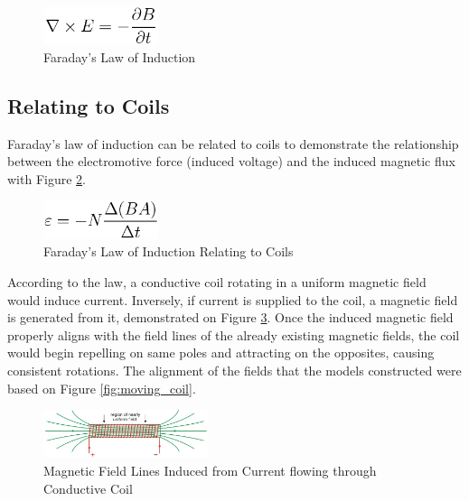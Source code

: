         \begin{figure}[ht]
            \begin{center}
                \includegraphics[width=0.3\textwidth]{figures/law_3.png}
                \caption{Faraday's Law of Induction} \label{fig:induction_law}
            \end{center}
        \end{figure}

    \subsection{Relating to Coils}
    Faraday's law of induction can be related to coils to demonstrate the relationship between the electromotive force (induced voltage) and the induced magnetic flux with Figure \ref{fig:coil_law}.\\

        \begin{figure}[ht]
            \begin{center}
                \includegraphics[width=0.3\textwidth]{figures/law_3c.png}
                \caption{Faraday's Law of Induction Relating to Coils} \label{fig:coil_law}
            \end{center}
        \end{figure}

    \noindent
    According to the law, a conductive coil rotating in a uniform magnetic field would induce current. Inversely, if current is supplied to the coil, a magnetic field is generated from it, demonstrated on Figure \ref{fig:coil}. Once the induced magnetic field properly aligns with the field lines of the already existing magnetic fields, the coil would begin repelling on same poles and attracting on the opposites, causing consistent rotations. The alignment of the fields that the models constructed were based on Figure \ref{fig:moving_coil}.

        \begin{figure}[ht]
            \begin{center}
                \includegraphics[width=0.43\textwidth]{figures/coil.jpg}
                \caption{Magnetic Field Lines Induced from Current flowing through Conductive Coil} \label{fig:coil}
            \end{center}
        \end{figure}

